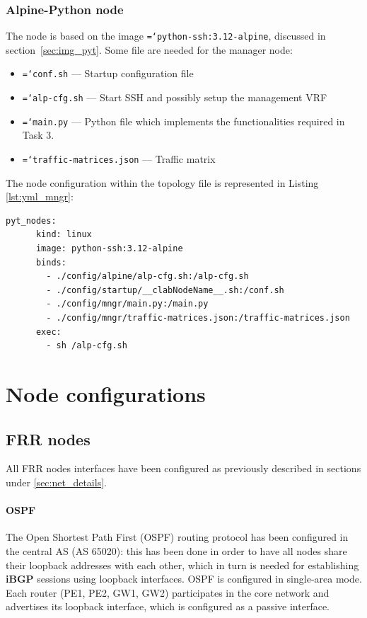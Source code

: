 \documentclass{report}
\newcommand{\monospaced}[1]{\texttt{\hyphenchar\font=`\-#1}}
\begin{document}
\subsubsection{Alpine-Python node}
The node is based on the image \monospaced{python-ssh:3.12-alpine}, discussed in section~\ref{sec:img_pyt}. Some file are needed for the manager node: 
\begin{itemize}
    \item \monospaced{conf.sh} --- Startup configuration file
    \item \monospaced{alp-cfg.sh} --- Start SSH and possibly setup the management VRF
    \item \monospaced{main.py} --- Python file which implements the functionalities required in Task 3.
    \item \monospaced{traffic-matrices.json} --- Traffic matrix
\end{itemize}
The node configuration within the topology file is represented in Listing \ref{lst:yml_mngr}:
\begin{lstlisting}[style=styleYml, caption=Manager node definition, label=lst:yml_mngr]
    pyt_nodes:
      kind: linux
      image: python-ssh:3.12-alpine
      binds:
        - ./config/alpine/alp-cfg.sh:/alp-cfg.sh
        - ./config/startup/__clabNodeName__.sh:/conf.sh
        - ./config/mngr/main.py:/main.py
        - ./config/mngr/traffic-matrices.json:/traffic-matrices.json
      exec:
        - sh /alp-cfg.sh
\end{lstlisting}


\section{Node configurations}
\subsection{FRR nodes}
All FRR nodes interfaces have been configured as previously described in sections under \ref{sec:net_details}.
\paragraph{OSPF} The Open Shortest Path First (OSPF) routing protocol has been configured in the central AS (AS 65020): this has been done in order to have all nodes share their loopback addresses with each other, which in turn is needed for establishing \textbf{iBGP} sessions using loopback interfaces.\newline
OSPF is configured in single-area mode. Each router (PE1, PE2, GW1, GW2) participates in the core network and advertises its loopback interface, which is configured as a passive interface.
\end{document}
